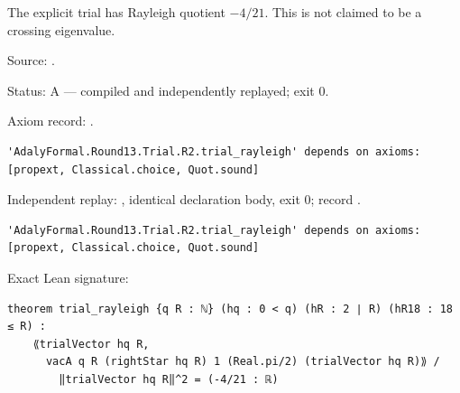 \begin{theorem}[bp-434]
\label{bp-434}
\leanok
The explicit trial has Rayleigh quotient \(-4/21\). This is not claimed to be a crossing eigenvalue.

\par Source: \texttt{}.
\par Status: A — compiled and independently replayed; exit 0.
\par Axiom record: \texttt{}.
\begin{verbatim}
'AdalyFormal.Round13.Trial.R2.trial_rayleigh' depends on axioms: [propext, Classical.choice, Quot.sound]
\end{verbatim}
\par Independent replay: \texttt{}, identical declaration body, exit 0; record \texttt{}.
\begin{verbatim}
'AdalyFormal.Round13.Trial.R2.trial_rayleigh' depends on axioms: [propext, Classical.choice, Quot.sound]
\end{verbatim}
\par Exact Lean signature:
\begin{verbatim}
theorem trial_rayleigh {q R : ℕ} (hq : 0 < q) (hR : 2 ∣ R) (hR18 : 18 ≤ R) :
    ⟪trialVector hq R,
      vacA q R (rightStar hq R) 1 (Real.pi/2) (trialVector hq R)⟫ /
        ‖trialVector hq R‖^2 = (-4/21 : ℝ)
\end{verbatim}
\end{theorem}

